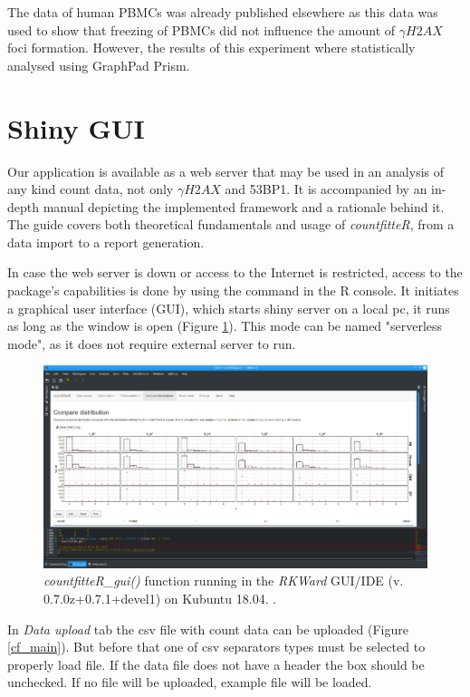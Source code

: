 The data of human PBMCs was already published elsewhere as this data was used to show that freezing of PBMCs did not influence the amount of $\gamma H2AX$ foci formation. However, the results of this experiment where statistically analysed using GraphPad Prism.


\section{Shiny GUI} %

Our application is available as a web server that may be used in an analysis of any kind count data, not only $\gamma H2AX$ and 53BP1. It is accompanied by an in-depth manual depicting the implemented framework and a rationale behind it. The guide covers both theoretical fundamentals and usage of \emph{countfitteR}, from a data import to a report generation.

In case the web server is down or access to the Internet is restricted, access to the package’s capabilities is done by using the command in the R console. It initiates a graphical user interface (GUI), which starts shiny server on a local pc, it runs as long as the window is open (Figure \ref{fig_gui}). This mode can be named "serverless mode", as it does not require external server to run.

\begin{figure}[htbp]
  \centering
  \includegraphics[width=0.99\columnwidth]{fig_gui}
  \caption{\emph{countfitteR\_gui()} function running in the \emph{RKWard} GUI/IDE (v. 0.7.0z+0.7.1+devel1) on Kubuntu 18.04. \citep{rodiger_rkward:_2012}.}
  \label{fig_gui}
\end{figure}
In \textit{Data upload} tab the csv file with count data can be uploaded (Figure \ref{cf_main}). But before that one of csv separators types must be selected to properly load file. If the data file does not have a header the box should be unchecked. If no file will be uploaded, example file will be loaded.

